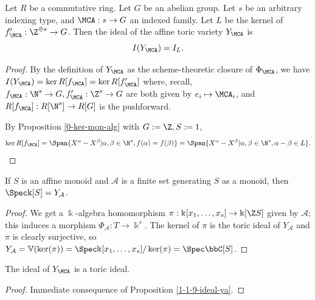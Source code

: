 \begin{proposition}
  \label{1-1-9-ideal-ya}

  Let $R$ be a commutative ring. Let $G$ be an abelian group.
  Let $s$ be an arbitrary indexing type, and $\MCA : s \to G$ an indexed family.
  Let $L$ be the kernel of $f'_\MCA : \Z^{\oplus s} \to G$.
  Then the ideal of the affine toric variety $Y_\MCA$ is
  \[
    I(Y_\MCA) = I_L.
  \]
\end{proposition}
\begin{proof}

  By the definition of $Y_\MCA$ as the scheme-theoretic closure of $\Phi_\MCA$,
  we have $I(Y_\MCA) = \ker R[f_\MCA] = \ker R[f'_\MCA]$ where, recall,
  $f_\MCA : \N^s \to G, f'_\MCA : \Z^s \to G$ are both given by $e_i \mapsto \MCA_i$,
  and $R[f_\MCA] : R[\N^s] \to R[G]$ is the pushforward.

  By Proposition \ref{0-ker-mon-alg} with $G := \Z, S := {1}$,
  \[
    \ker R[f_\MCA] = \Span\{X^\alpha - X^\beta | \alpha, \beta \in \N^s, f(\alpha) = f(\beta)\}
      = \Span\{X^\alpha - X^\beta | \alpha, \beta \in \N^s, \alpha - \beta \in L\}.
  \]
\end{proof}


\begin{proposition}
  \label{1-1-14-spec-aff-mon-alg}

  If $S$ is an affine monoid and $\mathcal A$ is a finite set generating $S$ as a monoid, then $\Spec \Bbbk[S] = Y_{\mathcal A}$.
\end{proposition}
\begin{proof}

  We get a $\Bbbk$-algebra homomorphism $\pi : \Bbbk[x_1, \dotsc, x_s] \to \Bbbk[\Z S]$ given by $\mathcal A$; this induces a morphism $\Phi_{\mathcal A} : T \to \Bbbk^s$. The kernel of $\pi$ is the toric ideal of $Y_{\mathcal A}$ and $\pi$ is clearly surjective, so $Y_{\mathcal A} = \mathbb V(\ker(\pi)) = \Spec \Bbbk[x_1, \dotsc, x_s] / \ker(\pi) = \Spec \bbC[S]$.
\end{proof}


\begin{proposition}
  \label{1-1-10-tor-ideal-ya}

  The ideal of $Y_\MCA$ is a toric ideal.
\end{proposition}
\begin{proof}

  Immediate consequence of Proposition \ref{1-1-9-ideal-ya}.
\end{proof}


